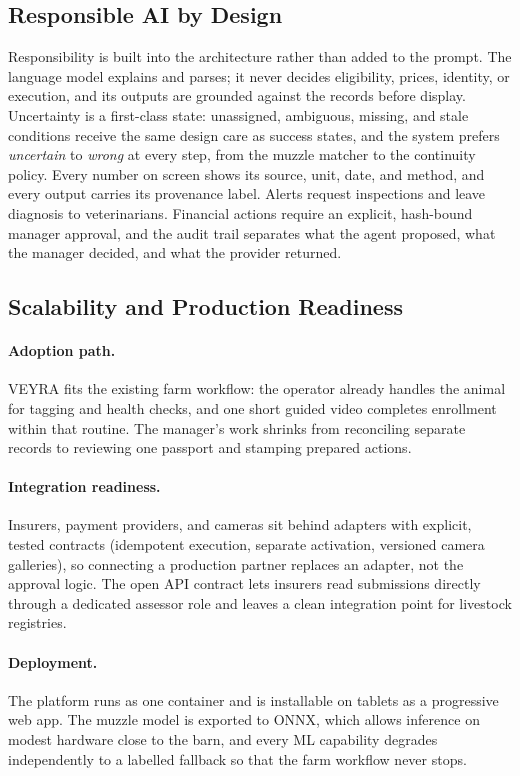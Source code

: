 \documentclass[11pt,letterpaper]{article}
\begin{document}
\subsection{Responsible AI by Design}

Responsibility is built into the architecture rather than added to the prompt. The language model explains and parses; it never decides eligibility, prices, identity, or execution, and its outputs are grounded against the records before display. Uncertainty is a first-class state: unassigned, ambiguous, missing, and stale conditions receive the same design care as success states, and the system prefers \emph{uncertain} to \emph{wrong} at every step, from the muzzle matcher to the continuity policy. Every number on screen shows its source, unit, date, and method, and every output carries its provenance label. Alerts request inspections and leave diagnosis to veterinarians. Financial actions require an explicit, hash-bound manager approval, and the audit trail separates what the agent proposed, what the manager decided, and what the provider returned.

\subsection{Scalability and Production Readiness}

\paragraph{Adoption path.} VEYRA fits the existing farm workflow: the operator already handles the animal for tagging and health checks, and one short guided video completes enrollment within that routine. The manager's work shrinks from reconciling separate records to reviewing one passport and stamping prepared actions.

\paragraph{Integration readiness.} Insurers, payment providers, and cameras sit behind adapters with explicit, tested contracts (idempotent execution, separate activation, versioned camera galleries), so connecting a production partner replaces an adapter, not the approval logic. The open API contract lets insurers read submissions directly through a dedicated assessor role and leaves a clean integration point for livestock registries.

\paragraph{Deployment.} The platform runs as one container and is installable on tablets as a progressive web app. The muzzle model is exported to ONNX, which allows inference on modest hardware close to the barn, and every ML capability degrades independently to a labelled fallback so that the farm workflow never stops.
\end{document}
